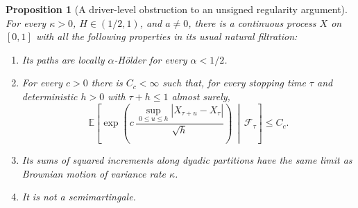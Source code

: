 \documentclass[11pt]{article}
\newtheorem{proposition}[theorem]{Proposition}
\theoremstyle{definition}\newtheorem{definition}[theorem]{Definition}
\theoremstyle{remark}\newtheorem{remark}[theorem]{Remark}
\begin{document}
\begin{proposition}[A driver-level obstruction to an unsigned regularity argument]
\label{prop:unsigned-nonsemimartingale}
For every $\kappa>0$, $H\in(1/2,1)$, and $a\ne0$, there is a continuous
process $X$ on $[0,1]$ with all the following properties in its usual
natural filtration:
\begin{enumerate}
\item Its paths are locally $\alpha$-H\"older for every $\alpha<1/2$.
\item For every $c>0$ there is $C_c<\infty$ such that, for every stopping
 time $\tau$ and deterministic $h>0$ with $\tau+h\le1$ almost surely,
 \[
 \mathbb E\!\left[\exp\!\left(
   c\,\frac{\sup_{0\le u\le h}|X_{\tau+u}-X_\tau|}{\sqrt h}
                  \right)\,\middle|\,\mathcal F_\tau\right]\le C_c.
 \tag{UR1}
 \]
\item Its sums of squared increments along dyadic partitions have the
 same limit as Brownian motion of variance rate $\kappa$.
\item It is not a semimartingale.
\end{enumerate}
\end{proposition}
\end{document}
